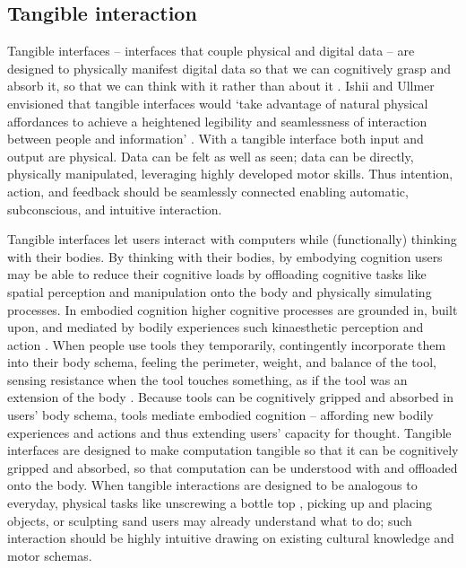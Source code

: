 \documentclass[prodmode,acmtochi]{acmsmall} %
\begin{document}
\subsection{Tangible interaction}
Tangible interfaces -- interfaces that couple physical and digital data \cite{Dourish2001} -- 
are designed to physically manifest digital data so that we can cognitively grasp and absorb it,
so that we can think with it rather than about it \cite{Kirsh2013}. 
%
Ishii and Ullmer envisioned that tangible interfaces would  `take advantage of natural physical affordances to achieve a heightened legibility and seamlessness of interaction between people and information' \cite{Ishii1997}. 
%
With a tangible interface both input and output are physical. 
%
Data can be felt as well as seen; data can be directly, physically manipulated, leveraging highly developed motor skills. 
%
Thus intention, action, and feedback should be seamlessly connected 
enabling automatic, subconscious, and intuitive interaction.

Tangible interfaces let users interact with computers while (functionally) thinking with their bodies. 
%
By thinking with their bodies, by embodying cognition 
users may be able to reduce their cognitive loads by
offloading cognitive tasks like 
spatial perception and manipulation 
onto the body and 
physically simulating processes.
%
In embodied cognition higher cognitive processes are grounded in, built upon, and mediated by bodily experiences such kinaesthetic perception and action \cite{Hardy-Vallee2008}. 
%
When people use tools they temporarily, contingently incorporate them into their body schema, feeling the perimeter, weight, and balance of the tool, 
sensing resistance when the tool touches something, 
as if the tool was an extension of the body \cite{Maravita2004}.
%
Because tools can be cognitively gripped and absorbed in users' body schema, tools mediate embodied cognition -- affording new bodily experiences and actions and thus extending users' capacity for thought. 
%
Tangible interfaces are designed to make computation tangible so that it can be cognitively gripped and absorbed, so that computation can be understood with and offloaded onto the body.
%
When tangible interactions are designed to be analogous to everyday, physical tasks 
like unscrewing a bottle top \cite{Kirsh2013}, 
picking up and placing objects, 
or sculpting sand 
users may already understand what to do; 
such interaction should be highly intuitive
drawing on existing cultural knowledge and motor schemas. 
\end{document}
